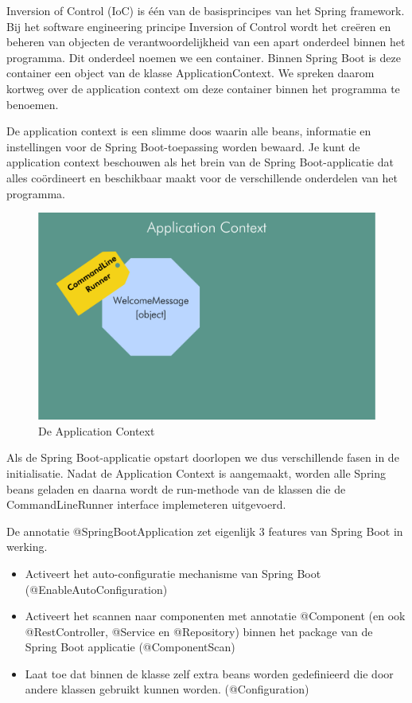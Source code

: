 Inversion of Control (IoC) is \'e\'en van de basisprincipes van het Spring framework.
Bij het software engineering principe Inversion of Control wordt het cre\"eren en beheren van objecten de verantwoordelijkheid van een apart onderdeel binnen het programma. Dit onderdeel noemen we een container. Binnen Spring Boot is deze container een object van de klasse ApplicationContext.  We spreken daarom kortweg over de application context om deze container binnen het programma te benoemen.

De application context is een slimme doos waarin alle beans, informatie en instellingen voor de Spring Boot-toepassing worden bewaard.  Je kunt de application context beschouwen als het brein van de Spring Boot-applicatie dat alles coördineert en beschikbaar maakt voor de verschillende onderdelen van het programma.

\begin{figure}[H]
  \includegraphics[width=\linewidth]{images/chapter1/application_context.png}
  \caption{De Application Context}
  \label{fig:application_context}
\end{figure}

Als de Spring Boot-applicatie opstart doorlopen we dus verschillende fasen in de initialisatie. Nadat de Application Context is aangemaakt, worden alle Spring beans geladen en daarna wordt de run-methode van de klassen die de CommandLineRunner interface implemeteren uitgevoerd.

De annotatie @SpringBootApplication zet eigenlijk 3 features van Spring Boot in werking. 
\begin{itemize}
\item Activeert het auto-configuratie mechanisme van Spring Boot (@EnableAutoConfiguration)
\item Activeert het scannen naar componenten met annotatie @Component (en ook @RestController,  @Service en @Repository) binnen het package  van de Spring Boot applicatie (@ComponentScan)
\item Laat toe dat binnen de klasse zelf extra beans worden gedefinieerd die door andere klassen gebruikt kunnen worden. (@Configuration)
\end{itemize}

